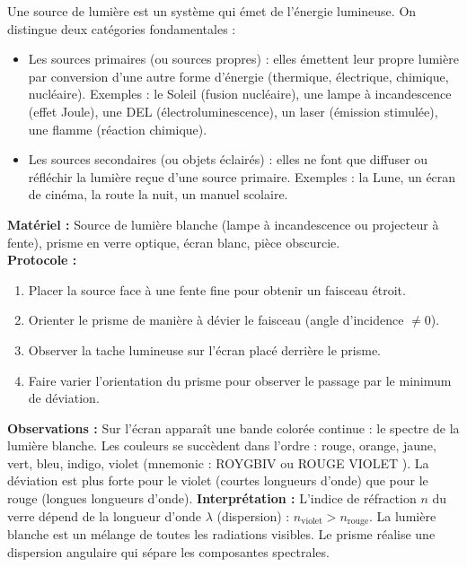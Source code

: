 \documentclass[11pt]{article}
\newcommand{\cle}[1]{{\popxbold\color{popdark}#1}}
\begin{document}
\begin{definition}
Une \cle{source de lumière} est un système qui émet de l'énergie lumineuse. On distingue deux catégories fondamentales :
\begin{itemize}
\item Les \cle{sources primaires} (ou sources propres) : elles émettent leur propre lumière par conversion d'une autre forme d'énergie (thermique, électrique, chimique, nucléaire). Exemples : le Soleil (fusion nucléaire), une lampe à incandescence (effet Joule), une DEL (électroluminescence), un laser (émission stimulée), une flamme (réaction chimique).
\item Les \cle{sources secondaires} (ou objets éclairés) : elles ne font que diffuser ou réfléchir la lumière reçue d'une source primaire. Exemples : la Lune, un écran de cinéma, la route la nuit, un manuel scolaire.
\end{itemize}
\end{definition}

\begin{experience}
\textbf{Matériel :} Source de lumière blanche (lampe à incandescence ou projecteur à fente), prisme en verre optique, écran blanc, pièce obscurcie.\\
\textbf{Protocole :}
\begin{enumerate}
\item Placer la source face à une fente fine pour obtenir un faisceau étroit.
\item Orienter le prisme de manière à dévier le faisceau (angle d'incidence $\neq 0$).
\item Observer la tache lumineuse sur l'écran placé derrière le prisme.
\item Faire varier l'orientation du prisme pour observer le passage par le \cle{minimum de déviation}.
\end{enumerate}
\textbf{Observations :} Sur l'écran apparaît une bande colorée continue : le \cle{spectre} de la lumière blanche. Les couleurs se succèdent dans l'ordre : rouge, orange, jaune, vert, bleu, indigo, violet (mnemonic : \og ROYGBIV \fg{} ou \og ROUGE VIOLET \fg{}). La déviation est plus forte pour le violet (courtes longueurs d'onde) que pour le rouge (longues longueurs d'onde).
\textbf{Interprétation :} L'indice de réfraction $n$ du verre dépend de la longueur d'onde $\lambda$ (\cle{dispersion}) : $n_{\text{violet}} > n_{\text{rouge}}$. La lumière blanche est un \cle{mélange} de toutes les radiations visibles. Le prisme réalise une \cle{dispersion} angulaire qui sépare les composantes spectrales.
\end{experience}
\end{document}
